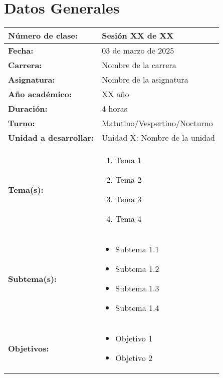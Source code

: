 \section{Datos Generales}

\begin{xltabular}{\linewidth}{@{}>{\bfseries}X X@{}}
    \toprule
    Número de clase:                           & Sesión XX de XX               \\
    \midrule
    Fecha:                                     & 03 de marzo de 2025           \\
    \midrule
    Carrera:                                   & Nombre de la carrera          \\
    \midrule
    Asignatura:                                & Nombre de la asignatura       \\
    \midrule
    Año académico:                             & XX año                        \\
    \midrule
    Duración:                                  & 4 horas                       \\
    \midrule
    Turno:                                     & Matutino/Vespertino/Nocturno  \\
    \midrule
    Unidad a desarrollar:                      & Unidad X: Nombre de la unidad \\
    \midrule
    Tema(s):                                   & \begin{enumerate}[topsep=0pt, partopsep=0pt, nosep]
        \item Tema 1
        \item Tema 2
        \item Tema 3
        \item Tema 4
    \end{enumerate}           \\
    \midrule
    Subtema(s):                                & \begin{itemize}
        \item Subtema 1.1
        \item Subtema 1.2
        \item Subtema 1.3
        \item Subtema 1.4
    \end{itemize}        \\
    \midrule
    Objetivos:                                 & \begin{itemize}
        \item Objetivo 1
        \item Objetivo 2

\end{itemize}
\end{xltabular}
